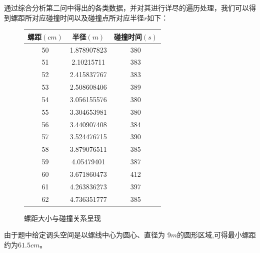 \documentclass[withoutpreface,bwprint]{cumcmthesis}
\begin{document}
通过综合分析第二问中得出的各类数据，并对其进行详尽的遍历处理，我们可以得到螺距所对应碰撞时间以及碰撞点所对应半径$r$如下：
\begin{figure}
	\centering
\begin{tabular}{|c|c|c|}
	\hline
	\textbf{螺距$(cm)$} & \textbf{半径$(m)$} & \textbf{碰撞时间$(s)$} \\ \hline
	50 & 1.878907823 & 380 \\ \hline
	51 & 2.10215711 & 383 \\ \hline
	52 & 2.415837767 & 383 \\ \hline
	53 & 2.508608406 & 389 \\ \hline
	54 & 3.056155576 & 380 \\ \hline
	55 & 3.304653981 & 380\\ \hline
	56 & 3.440907408 & 384 \\ \hline
	57 & 3.524476715 & 390 \\ \hline
	58 & 3.879076511 & 385 \\ \hline
	59 & 4.05479401 & 387 \\ \hline
	60 & 3.671860473 & 412 \\ \hline
	61 & 4.263836273 & 397 \\ \hline
	62 & 4.736351777 & 385 \\ \hline
\end{tabular}
	\caption{螺距大小与碰撞关系呈现}           
\end{figure}
由于题中给定调头空间是以螺线中心为圆心、直径为 9$m$的圆形区域,可得最小螺距约为$61.5cm$。
\end{document}
